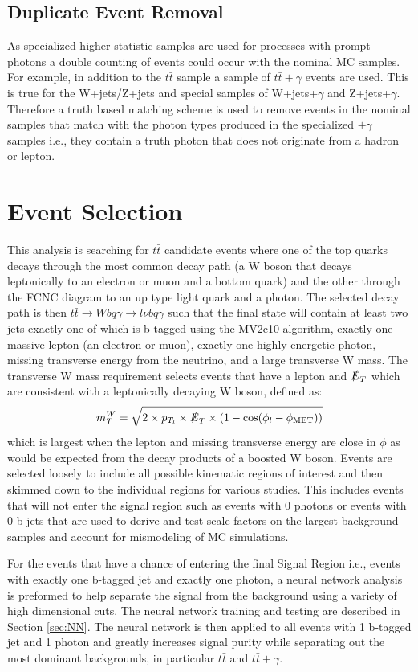 \subsection{Duplicate Event Removal}
As specialized higher statistic samples are used for processes with prompt photons a double counting of events could occur with the nominal MC samples.  For example, in addition to the $t\bar{t}$ sample a sample of $t\bar{t}+\gamma$ events are used.  This is true for the W+jets/Z+jets and special samples of W+jets+$\gamma$ and Z+jets+$\gamma$.  Therefore a truth based matching scheme is used to remove events in the nominal samples that match with the photon types produced in the specialized $+\gamma$ samples i.e., they contain a truth photon that does not originate from a hadron or lepton.

\section{Event Selection}
This analysis is searching for $t\bar{t}$ candidate events where one of the top quarks decays through the most common decay path (a W boson that decays leptonically to an electron or muon and a bottom quark) and the other through the FCNC diagram to an up type light quark and a photon.  The selected decay path is then $t\bar{t} \rightarrow Wbq\gamma \rightarrow l\nu b q \gamma$ such that the final state will contain at least two jets exactly one of which is b-tagged using the MV2c10 algorithm, exactly one massive lepton (an electron or muon), exactly one highly energetic photon, missing transverse energy from the neutrino, and a large transverse W mass.  The transverse W mass requirement selects events that have a lepton and $\slashed{E}_T$ which are consistent with a leptonically decaying W boson, defined as:
\[ m_T^{W} =  \sqrt{2\times p_{T_l}\times \slashed{E}_T \times (1 - \text{cos}(\phi_l -\phi_{\text{MET}}))}\]
which is largest when the lepton and missing transverse energy are close in $\phi$ as would be expected from the decay products of a boosted W boson.  Events are selected loosely to include all possible kinematic regions of interest and then skimmed down to the individual regions for various studies.  This includes events that will not enter the signal region such as events with 0 photons or events with 0 b jets that are used to derive and test scale factors on the largest background samples and account for mismodeling of MC simulations. 

For the events that have a chance of entering the final Signal Region i.e., events with exactly one b-tagged jet and exactly one photon, a neural network analysis is preformed to help separate the signal from the background using a variety of high dimensional cuts.  The neural network training and testing are described in Section \ref{sec:NN}.  The neural network is then applied to all events with 1 b-tagged jet and 1 photon and greatly increases signal purity while separating out the most dominant backgrounds, in particular $t\bar{t}$ and $t\bar{t}+\gamma$.




